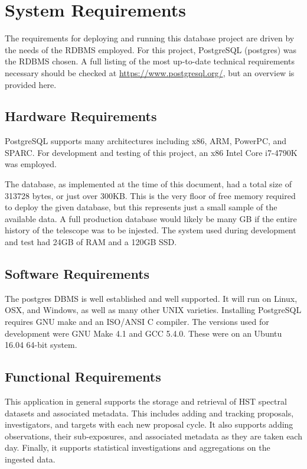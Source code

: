 \documentclass[a4paper,11pt]{article}
\begin{document}
\section{System Requirements}
The requirements for deploying and running this database project are driven by the needs of the RDBMS employed.  For this project, PostgreSQL (postgres) was the RDBMS chosen.  A full listing of the most up-to-date technical requirements necessary should be checked at
\href{https://www.postgresql.org/}{https://www.postgresql.org/}, but an overview is provided here. 

\subsection{Hardware Requirements}
PostgreSQL supports many architectures including x86, ARM, PowerPC, and SPARC.  For development and testing of this project, an x86 Intel Core i7-4790K was employed.  

The database, as implemented at the time of this document, had a total size of 313728 bytes, or just over 300KB.  This is the very floor of free memory required to deploy the given database, but this represents just a small sample of the available data. A full production database would likely be many GB if the entire history of the telescope was to be injested.  The system used during development and test had 24GB of RAM and a 120GB SSD.  

\subsection{Software Requirements}
The postgres DBMS is well established and well supported.  It will run on Linux, OSX, and Windows, as well as many other UNIX varieties. Installing PostgreSQL requires GNU make and an ISO/ANSI C compiler.  The versions used for development were GNU Make 4.1 and GCC 5.4.0.  These were on an Ubuntu 16.04 64-bit system.

\subsection{Functional Requirements}
This application in general supports the storage and retrieval of HST spectral datasets and associated metadata.  This includes adding and tracking proposals, investigators, and targets with each new proposal cycle.  It also supports adding observations, their sub-exposures, and associated metadata as they are taken each day.  Finally, it supports statistical investigations and aggregations on the ingested data. 
\end{document}
